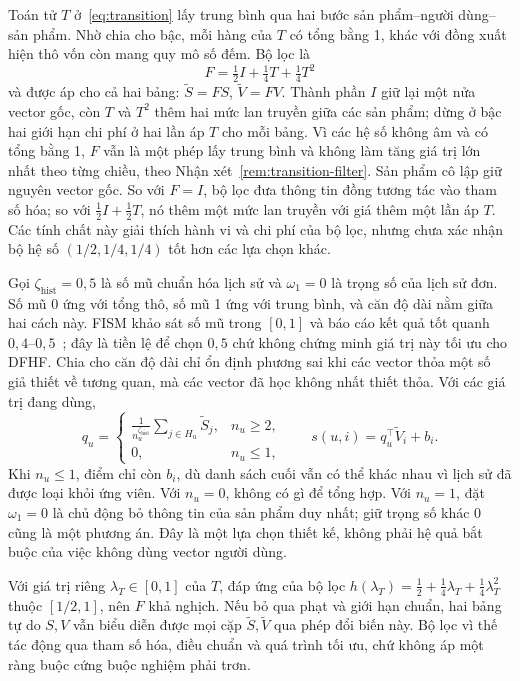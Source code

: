 Toán tử $T$ ở~\eqref{eq:transition} lấy trung bình qua hai bước sản phẩm--người dùng--sản phẩm. Nhờ chia cho bậc, mỗi hàng của $T$ có tổng bằng 1, khác với đồng xuất hiện thô vốn còn mang quy mô số đếm. Bộ lọc là
\begin{equation}
F = \tfrac12 I + \tfrac14 T + \tfrac14 T^2
\label{eq:dfhf-filter}
\end{equation}
và được áp cho cả hai bảng: $\tilde S=FS$, $\tilde V=FV$. Thành phần $I$ giữ lại một nửa vector gốc, còn $T$ và $T^2$ thêm hai mức lan truyền giữa các sản phẩm; dừng ở bậc hai giới hạn chi phí ở hai lần áp $T$ cho mỗi bảng. Vì các hệ số không âm và có tổng bằng 1, $F$ vẫn là một phép lấy trung bình và không làm tăng giá trị lớn nhất theo từng chiều, theo Nhận xét~\ref{rem:transition-filter}. Sản phẩm cô lập giữ nguyên vector gốc. So với $F=I$, bộ lọc đưa thông tin đồng tương tác vào tham số hóa; so với $\tfrac12I+\tfrac12T$, nó thêm một mức lan truyền với giá thêm một lần áp $T$. Các tính chất này giải thích hành vi và chi phí của bộ lọc, nhưng chưa xác nhận bộ hệ số $(1/2,1/4,1/4)$ tốt hơn các lựa chọn khác.

Gọi $\zeta_{\mathrm{hist}}=0{,}5$ là số mũ chuẩn hóa lịch sử và $\omega_1=0$ là trọng số của lịch sử đơn. Số mũ 0 ứng với tổng thô, số mũ 1 ứng với trung bình, và căn độ dài nằm giữa hai cách này. FISM khảo sát số mũ trong $[0,1]$ và báo cáo kết quả tốt quanh $0{,}4$--$0{,}5$~\cite[Mục~4, 7.2]{kabbur2013fism}; đây là tiền lệ để chọn $0{,}5$ chứ không chứng minh giá trị này tối ưu cho DFHF. Chia cho căn độ dài chỉ ổn định phương sai khi các vector thỏa một số giả thiết về tương quan, mà các vector đã học không nhất thiết thỏa. Với các giá trị đang dùng,
\begin{equation}
q_u=\begin{cases}
\displaystyle \frac{1}{n_u^{\zeta_{\mathrm{hist}}}}\sum_{j\in H_u}\tilde S_j,&n_u\ge2,\\
0,&n_u\le1,
\end{cases}
\qquad s(u,i)=q_u^\top\tilde V_i+b_i.
\label{eq:dfhf-score}
\end{equation}
Khi $n_u\le1$, điểm chỉ còn $b_i$, dù danh sách cuối vẫn có thể khác nhau vì lịch sử đã được loại khỏi ứng viên. Với $n_u=0$, không có gì để tổng hợp. Với $n_u=1$, đặt $\omega_1=0$ là chủ động bỏ thông tin của sản phẩm duy nhất; giữ trọng số khác 0 cũng là một phương án. Đây là một lựa chọn thiết kế, không phải hệ quả bắt buộc của việc không dùng vector người dùng.

Với giá trị riêng $\lambda_T\in[0,1]$ của $T$, đáp ứng của bộ lọc $h(\lambda_T)=\tfrac12+\tfrac14\lambda_T+\tfrac14\lambda_T^2$ thuộc $[1/2,1]$, nên $F$ khả nghịch. Nếu bỏ qua phạt và giới hạn chuẩn, hai bảng tự do $S,V$ vẫn biểu diễn được mọi cặp $\tilde S,\tilde V$ qua phép đổi biến này. Bộ lọc vì thế tác động qua tham số hóa, điều chuẩn và quá trình tối ưu, chứ không áp một ràng buộc cứng buộc nghiệm phải trơn.

